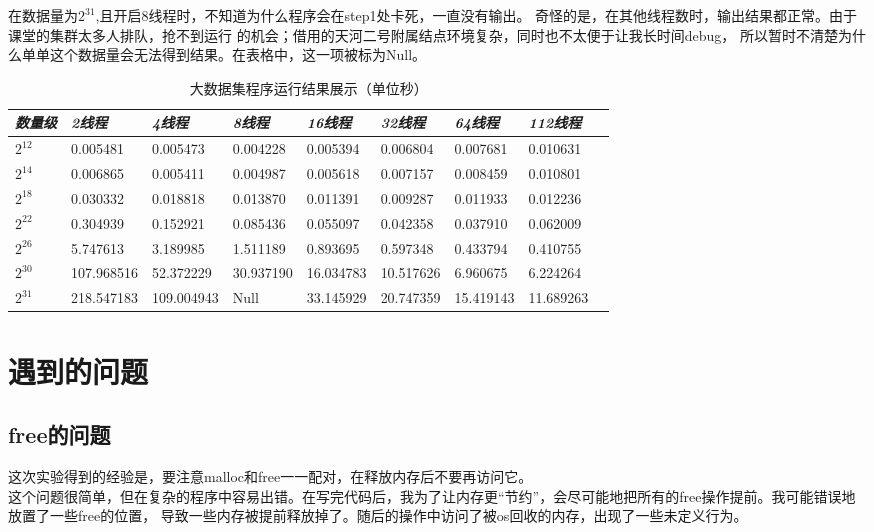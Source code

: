 \documentclass[a4paper]{article}
\begin{document}
在数据量为$2^{31}$,且开启8线程时，不知道为什么程序会在step1处卡死，一直没有输出。
奇怪的是，在其他线程数时，输出结果都正常。由于课堂的集群太多人排队，抢不到运行
的机会；借用的天河二号附属结点环境复杂，同时也不太便于让我长时间debug，
所以暂时不清楚为什么单单这个数据量会无法得到结果。在表格中，这一项被标为Null。
\begin{table}[!htb]
\caption{大数据集程序运行结果展示（单位秒）}\label{tab:res}
\begin{tabular}{@{} *9l @{}}
    \toprule
\emph{数量级} & \emph{2线程} &\emph{4线程}& \emph{8线程}& \emph{16线程} & \emph{32线程} & \emph{64线程} & \emph{112线程}\\
    \midrule 
    $ 2^{12} $ & 0.005481 & 0.005473 & 0.004228 & 0.005394 & 0.006804 & 0.007681 & 0.010631 & \\ 
$ 2^{14} $ & 0.006865 & 0.005411 & 0.004987 & 0.005618 & 0.007157 & 0.008459 & 0.010801 & \\ 
$ 2^{18} $ & 0.030332 & 0.018818 & 0.013870 & 0.011391 & 0.009287 & 0.011933 & 0.012236 & \\ 
$ 2^{22} $ & 0.304939 & 0.152921 & 0.085436 & 0.055097 & 0.042358 & 0.037910 & 0.062009 & \\ 
$ 2^{26} $ & 5.747613 & 3.189985 & 1.511189 & 0.893695 & 0.597348 & 0.433794 & 0.410755 & \\ 
$ 2^{30} $ & 107.968516 & 52.372229 & 30.937190 & 16.034783 & 10.517626 & 6.960675 & 6.224264 & \\ 
$ 2^{31} $ & 218.547183 & 109.004943 & Null & 33.145929 & 20.747359 & 15.419143 & 11.689263 & \\ 

    \bottomrule
\hline
\end{tabular}
\end{table}



\section{遇到的问题}
\subsection{free的问题}
这次实验得到的经验是，要注意malloc和free一一配对，在释放内存后不要再访问它。\\

这个问题很简单，但在复杂的程序中容易出错。在写完代码后，我为了让内存更``节约''，会尽可能地把所有的free操作提前。我可能错误地放置了一些free的位置，
导致一些内存被提前释放掉了。随后的操作中访问了被os回收的内存，出现了一些未定义行为。\\
\end{document}

